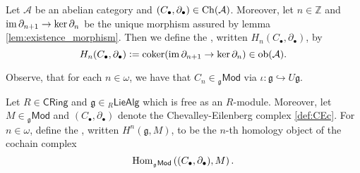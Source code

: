 \begin{definition}
	Let $\mathcal{A}$ be an abelian category and $(C_\bullet,\partial_\bullet) \in \operatorname{Ch}(\mathcal{A})$. Moreover, let $n \in \mathbb{Z}$ and $\operatorname{im} \partial_{n + 1} \to \ker \partial_n$ be the unique morphism assured by lemma \ref{lem:existence_morphism}. Then we define the , written $H_n(C_\bullet,\partial_\bullet)$, by
	\begin{equation*}
		H_n(C_\bullet,\partial_\bullet) := \operatorname{coker}(\operatorname{im} \partial_{n + 1} \to \ker \partial_n) \in \operatorname{ob}(\mathcal{A}).
	\end{equation*} 
\end{definition}

Observe, that for each $n \in \omega$, we have that $C_n \in {_{\mathfrak{g}}}\mathsf{Mod}$ via $\iota : \mathfrak{g} \hookrightarrow U\mathfrak{g}$.

\begin{definition}
	Let $R \in \mathsf{CRing}$ and $\mathfrak{g} \in {_{R}}\mathsf{LieAlg}$ which is free as an $R$-module. Moreover, let $M \in {_{\mathfrak{g}}}\mathsf{Mod}$ and $(C_\bullet,\partial_\bullet)$ denote the Chevalley-Eilenberg complex \ref{def:CEc}. For $n \in \omega$, define the , written $H^n(\mathfrak{g},M)$, to be the $n$-th homology object of the cochain complex 
	\begin{equation*}
		\Hom_{_{\mathfrak{g}}\mathsf{Mod}}\del[0]{(C_\bullet,\partial_\bullet),M}.
	\end{equation*}
\end{definition}

